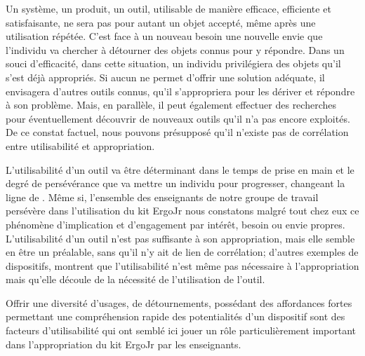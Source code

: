     Un système, un produit, un outil, \etc utilisable de manière efficace, efficiente et satisfaisante, ne sera pas pour autant un objet accepté, même après une utilisation répétée. C'est face à un nouveau besoin \etou une nouvelle envie que l'individu va chercher à détourner des objets connus pour y répondre. Dans un souci d'efficacité, dans cette situation, un individu privilégiera des objets qu'il s'est déjà appropriés. Si aucun ne permet d'offrir une solution adéquate, il envisagera d'autres outils connus, qu'il s'appropriera pour les dériver et répondre à son problème. Mais, en parallèle, il peut également effectuer des recherches pour éventuellement découvrir de nouveaux outils qu'il n'a pas encore exploités. De ce constat factuel, nous pouvons présupposé qu'il n'existe pas de corrélation entre utilisabilité et appropriation.\par\vspace{0.2cm}%
    L'utilisabilité d'un outil va être déterminant dans le temps de prise en main et le degré de persévérance que va mettre un individu pour progresser, changeant la ligne de .
    Même si, l'ensemble des enseignants de notre groupe de travail persévère dans l'utilisation du kit ErgoJr  nous constatons malgré tout chez eux ce phénomène d'implication et d'engagement par intérêt, besoin ou envie propres.
    L'utilisabilité d'un outil n'est pas suffisante à son appropriation, mais elle semble en être un préalable, sans qu'il n'y ait de lien de corrélation; d'autres exemples de dispositifs, montrent que l'utilisabilité n'est même pas nécessaire à l'appropriation mais qu'elle découle de la nécessité de l'utilisation de l'outil.\par\vspace{0.2cm}%
    Offrir une diversité d'usages, de détournements, possédant des affordances fortes permettant une compréhension rapide des potentialités d'un dispositif sont des facteurs d'utilisabilité qui ont semblé ici jouer un rôle particulièrement important dans l'appropriation du kit ErgoJr par les enseignants.